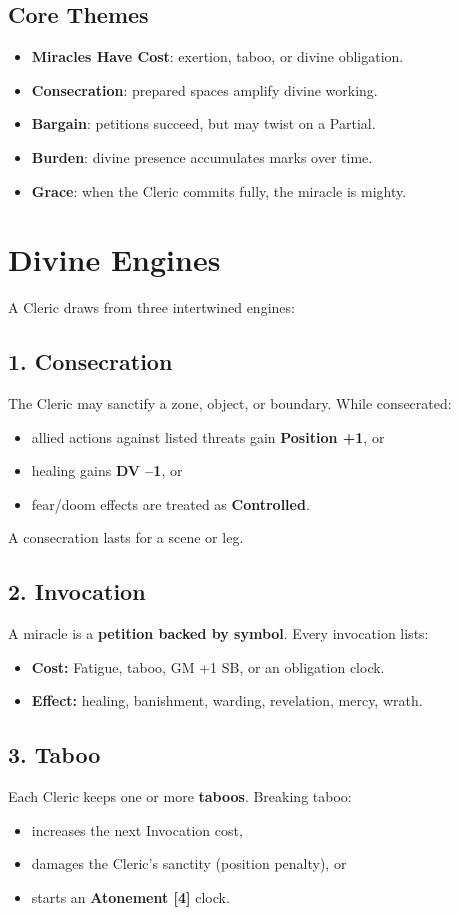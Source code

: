 \documentclass[11pt]{book}
\begin{document}
\subsection{Core Themes}
\begin{itemize}
  \item \textbf{Miracles Have Cost}: exertion, taboo, or divine obligation.
  \item \textbf{Consecration}: prepared spaces amplify divine working.
  \item \textbf{Bargain}: petitions succeed, but may twist on a Partial.
  \item \textbf{Burden}: divine presence accumulates marks over time.
  \item \textbf{Grace}: when the Cleric commits fully, the miracle is mighty.
\end{itemize}

\section{Divine Engines}
A Cleric draws from three intertwined engines:

\subsection{1. Consecration}
The Cleric may sanctify a zone, object, or boundary.  
While consecrated:
\begin{itemize}
  \item allied actions against listed threats gain \textbf{Position +1}, or
  \item healing gains \textbf{DV --1}, or
  \item fear/doom effects are treated as \textbf{Controlled}.
\end{itemize}
A consecration lasts for a scene or leg.

\subsection{2. Invocation}
A miracle is a \textbf{petition backed by symbol}.  
Every invocation lists:
\begin{itemize}
  \item \textbf{Cost:} Fatigue, taboo, GM +1 SB, or an obligation clock.
  \item \textbf{Effect:} healing, banishment, warding, revelation, mercy, wrath.
\end{itemize}

\subsection{3. Taboo}
Each Cleric keeps one or more \textbf{taboos}. Breaking taboo:
\begin{itemize}
  \item increases the next Invocation cost,
  \item damages the Cleric's sanctity (position penalty), or
  \item starts an \textbf{Atonement [4]} clock.
\end{itemize}
\end{document}
